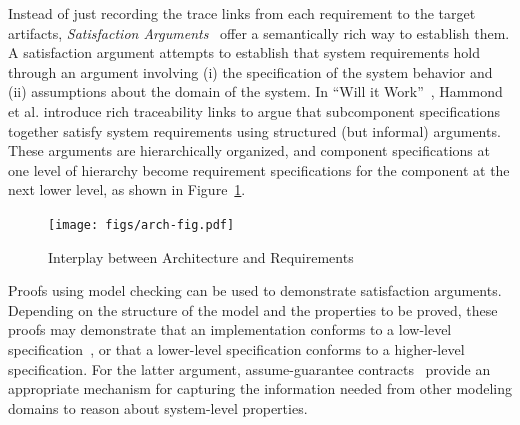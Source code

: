 





\iffalse
Instead of just recording the trace links from each requirement to the target artifacts, \emph{Satisfaction Arguments}~\cite{zave1997four,Hammond01:WiW} offer a semantically rich way to establish them.
A satisfaction argument attempts to establish that system requirements hold through an argument involving (i) the specification of the system behavior and (ii) assumptions about the domain of the system.
In ``Will it Work''~\cite{Hammond01:WiW}, Hammond et al. introduce rich traceability links to argue that subcomponent specifications together satisfy system requirements using structured (but informal) arguments.  These arguments are hierarchically organized, and component specifications at one level of hierarchy become requirement specifications for the component at the next lower level, as shown in Figure~\ref{fig:arch-fig}.

\begin{figure}
 \centering
  \texttt{[image: figs/arch-fig.pdf]}
  \caption{Interplay between Architecture and Requirements}
  \label{fig:arch-fig}
\end{figure}


Proofs using model checking can be used to demonstrate satisfaction arguments.  Depending on the structure of the model and the properties to be proved, these proofs may demonstrate that an implementation conforms to a low-level specification~\cite{Miller10:CACM}, or that a lower-level specification conforms to a higher-level specification.  For the latter argument, assume-guarantee contracts~\cite{NFM2012:CoGaMiWhLaLu,Whalen13:WhatHow:TwinPeaksIEEESoftware} provide an appropriate mechanism for capturing the information needed from other modeling domains to reason about system-level properties.

